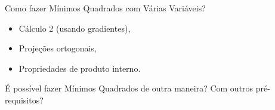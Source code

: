 
\begin{frame}{Como fazer Mínimos Quadrados com Várias Variáveis?}

  \begin{itemize}
    \item Cálculo 2 (usando gradientes), \\[0.5cm]
    \item Projeções ortogonais, \\[0.5cm]
    \item Propriedades de produto interno.
  \end{itemize}

  \vspace{1cm} \pause

  \begin{center}
    É possível fazer Mínimos Quadrados de outra maneira? Com outros pré-requisitos?
  \end{center}

\end{frame}